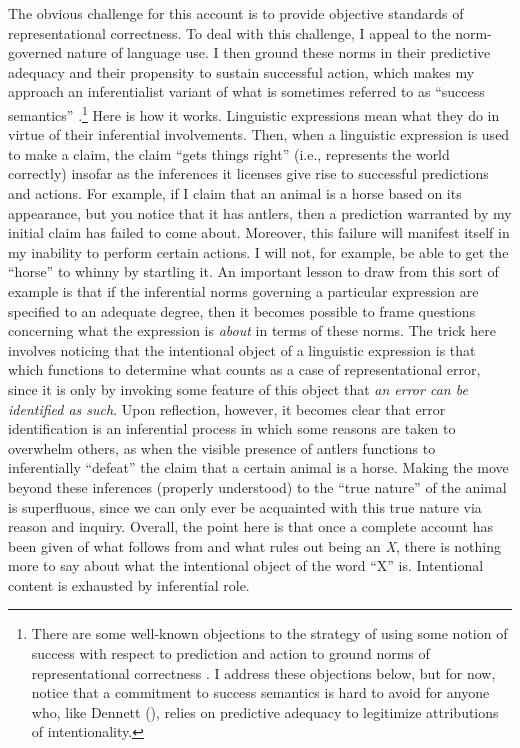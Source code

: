 The obvious challenge for this account is to provide objective standards of representational correctness. To deal with this challenge, I appeal to the norm-governed nature of language use. I then ground these norms in their predictive adequacy and their propensity to sustain successful action, which makes my approach an inferentialist variant of what is sometimes referred to as ``success semantics'' \citep{Whyte:1990,Blackburn:2005}.\footnote{There are some well-known objections to the strategy of using some notion of success with respect to prediction and action to ground norms of representational correctness \citep{Brandom:1994b,Brandom:2011,Blackburn:2005}. I address these objections below, but for now, notice that a commitment to success semantics is hard to avoid for anyone who, like Dennett (\citeyear{Dennett:1987,Dennett:1991}), relies on predictive adequacy to legitimize attributions of intentionality.} Here is how it works. Linguistic expressions mean what they do in virtue of their inferential involvements. Then, when a linguistic expression is used to make a claim, the claim ``gets things right'' (i.e., represents the world correctly) insofar as the inferences it licenses give rise to successful predictions and actions. For example, if I claim that an animal is a horse based on its appearance, but you notice that it has antlers, then a prediction warranted by my initial claim has failed to come about. Moreover, this failure will manifest itself in my inability to perform certain actions. I will not, for example, be able to get the ``horse'' to whinny by startling it. An important lesson to draw from this sort of example is that if the inferential norms governing a particular expression are specified to an adequate degree, then it becomes possible to frame questions concerning what the expression is \textit{about} in terms of these norms. The trick here involves noticing that the intentional object of a linguistic expression is that which functions to determine what counts as a case of representational error, since it is only by invoking some feature of this object that \textit{an error can be identified as such}. Upon reflection, however, it becomes clear that error identification is an inferential process in which some reasons are taken to overwhelm others, as when the visible presence of antlers functions to inferentially ``defeat'' the claim that a certain animal is a horse. Making the move beyond these inferences (properly understood) to the ``true nature'' of the animal is superfluous, since we can only ever be acquainted with this true nature via reason and inquiry. Overall, the point here is that once a complete account has been given of what follows from and what rules out being an \textit{X}, there is nothing more to say about what the intentional object of the word ``X'' is. Intentional content is exhausted by inferential role. 

